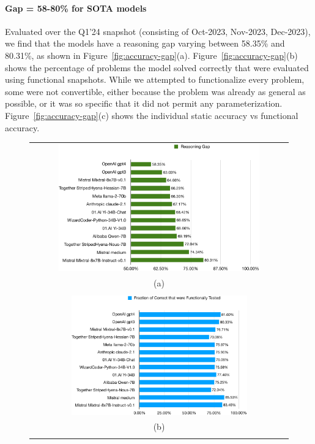 \documentclass[11pt,a4paper]{article}
\begin{document}
\paragraph{Gap = 58-80\% for SOTA models} Evaluated over the Q1'24 snapshot (consisting of Oct-2023, Nov-2023, Dec-2023), we find that the models have a reasoning gap varying between 58.35\% and 80.31\%, as shown in Figure~\ref{fig:accuracy-gap}(a). Figure~\ref{fig:accuracy-gap}(b) shows the percentage of problems the model solved correctly that were evaluated using functional snapshots. While we attempted to functionalize every problem, some were not convertible, either because the problem was already as general as possible, or it was so specific that it did not permit any parameterization. Figure~\ref{fig:accuracy-gap}(c) shows the individual static accuracy vs functional accuracy.
\begin{figure}
  \begin{tabular}{c}
    \includegraphics[width=0.80\textwidth]{all-reasoning-gap}\\
    (a)\\\\
    \includegraphics[width=0.70\textwidth]{all-coverage}\\
    (b)\\\\

\end{tabular}
\end{figure}
\end{document}
